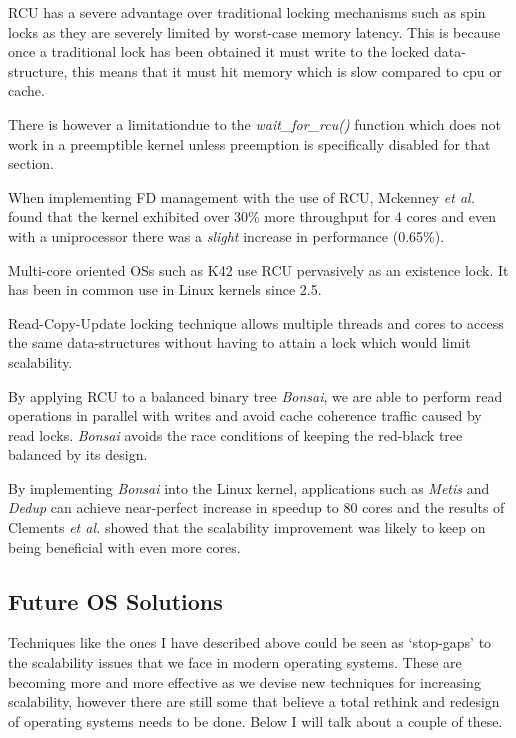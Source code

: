 \documentclass[journal]{IEEEtran}
\begin{document}
RCU has a severe advantage over traditional locking mechanisms such as spin locks as they are severely limited by worst-case memory latency. This is because once a traditional lock has been obtained it must write to the locked data-structure, this means that it must hit memory which is slow compared to cpu or cache.

There is however a limitationdue to the \emph{wait\_for\_rcu()} function which does not work in a preemptible kernel unless preemption is specifically disabled for that section.

When implementing FD management with the use of RCU, Mckenney \emph{et al.} \cite{RCU} found that the kernel exhibited over 30\% more throughput for 4 cores and even with a uniprocessor there was a \emph{slight} increase in performance (0.65\%).

Multi-core oriented OSs such as K42 \cite{K42} use RCU pervasively as an existence lock. It has been in common use in Linux kernels since 2.5.

Read-Copy-Update locking technique allows multiple threads and cores to access the same data-structures without having to attain a lock which would limit scalability.

By applying RCU to a balanced binary tree \cite{Bonsai} \emph{Bonsai}, we are able to perform read operations in parallel with writes and avoid cache coherence traffic caused by read locks. \emph{Bonsai} avoids the race conditions of keeping the red-black tree balanced by its design.

By implementing \emph{Bonsai} into the Linux kernel, applications such as \emph{Metis} and \emph{Dedup} can achieve near-perfect increase in speedup to 80 cores and the results of Clements \emph{et al.} showed that the scalability improvement was likely to keep on being beneficial with even more cores.

\subsection{Future OS Solutions}

Techniques like the ones I have described above could be seen as `stop-gaps' to the scalability issues that we face in modern operating systems. These are becoming more and more effective as we devise new techniques for increasing scalability, however there are still some that believe a total rethink and redesign of operating systems needs to be done. Below I will talk about a couple of these.
\end{document}
